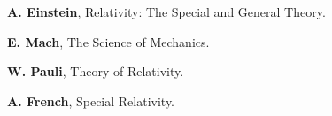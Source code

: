 \documentclass[10pt,fleqn]{article}
\begin{document}
\vspace{+0.60em}

\par {}

\bigskip \smallskip

\par \noindent \textbf{A. Einstein}, Relativity: The Special and General Theory.
\bigskip \smallskip
\par \noindent \textbf{E. Mach}, The Science of Mechanics.
\bigskip \smallskip
\par \noindent \textbf{W. Pauli}, Theory of Relativity.
\bigskip \smallskip
\par \noindent \textbf{A. French}, Special Relativity.

\newpage

\par {}

\smallskip

\par {}

\bigskip \smallskip
\end{document}
